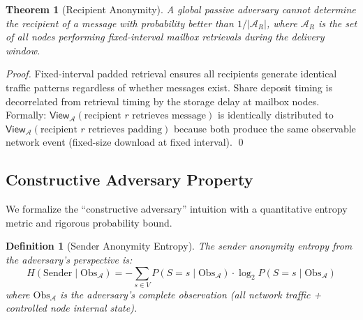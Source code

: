 \documentclass[11pt,a4paper]{article}
\newtheorem{theorem}{Theorem}
\newtheorem{definition}{Definition}
\newcommand{\Adv}{\mathcal{A}}
\newcommand{\view}{\mathsf{View}}
\begin{document}
\begin{theorem}[Recipient Anonymity]
A global passive adversary cannot determine the recipient of a message with probability better than $1/|\mathcal{A}_R|$, where $\mathcal{A}_R$ is the set of all nodes performing fixed-interval mailbox retrievals during the delivery window.
\end{theorem}

\begin{proof}
Fixed-interval padded retrieval ensures all recipients generate identical traffic patterns regardless of whether messages exist. Share deposit timing is decorrelated from retrieval timing by the storage delay at mailbox nodes. Formally: $\view_\Adv(\text{recipient } r \text{ retrieves message})$ is identically distributed to $\view_\Adv(\text{recipient } r \text{ retrieves padding})$ because both produce the same observable network event (fixed-size download at fixed interval). \qed
\end{proof}

\subsection{Constructive Adversary Property}

We formalize the ``constructive adversary'' intuition with a quantitative entropy metric and rigorous probability bound.

\begin{definition}[Sender Anonymity Entropy]
\label{def:entropy}
The \emph{sender anonymity entropy} from the adversary's perspective is:
\[
H(\text{Sender} \mid \text{Obs}_\Adv) = -\sum_{s \in V} P(S = s \mid \text{Obs}_\Adv) \cdot \log_2 P(S = s \mid \text{Obs}_\Adv)
\]
where $\text{Obs}_\Adv$ is the adversary's complete observation (all network traffic + controlled node internal state).
\end{definition}
\end{document}
